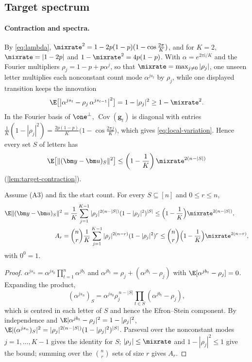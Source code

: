 \subsection{Target spectrum}
\label{app:target-spectrum}

\paragraph{Contraction and spectra.}\label{app:contraction} By \cref{eq:lambda}, $\mixrate^2=1-2p(1-p)(1-\cos\tfrac{2\pi}{K})$, and for $K=2$,
$\mixrate=|1-2p|$ and $1-\mixrate^2=4p(1-p)$. With $\alpha=e^{2\pi\mathrm i/K}$ and the Fourier multipliers
$\rho_j=1-p+p\alpha^j$, so that $\mixrate=\max_{j\ne0}|\rho_j|$, one unseen letter multiplies each nonconstant count
mode $\alpha^{js_t}$ by $\rho_j$, while one displayed transition keeps the innovation
\begin{equation}
 \E\bigl[\bigl|\alpha^{j s_t}-\rho_j\,\alpha^{j s_{t-1}}\bigr|^2\bigr]=1-|\rho_j|^2\ge1-\mixrate^2 .
 \label{eq:move-variance}
\end{equation}
In the Fourier basis of $\one^\perp$, $\operatorname{Cov}(\bm g_t)$ is diagonal with entries $\tfrac{1}{K}(1-|\rho_j|^2)=\tfrac{2p(1-p)}{K}\bigl(1-\cos\tfrac{2\pi j}{K}\bigr)$,
which gives \cref{eq:local-variation}. Hence every set $S$ of letters has
\begin{equation}
 \E\bigl[\|(\bm y-\bm u)_S\|^2\bigr]\le\left(1-\frac{1}{K}\right)\mixrate^{2(n-|S|)}
 \label{eq:horizon}
\end{equation}
(\cref{lem:target-contraction}).

\begin{lemma}
\label{lem:target-contraction}
Assume (A3) and fix the start count. For every $S\subseteq[n]$ and $0\le r\le n$,
\begin{align*}
 \E\|(\bm y-\bm u)_S\|^2&=\frac{1}{K}\sum_{j=1}^{K-1}|\rho_j|^{2(n-|S|)}(1-|\rho_j|^2)^{|S|}\le\Bigl(1-\frac{1}{K}\Bigr)\mixrate^{2(n-|S|)},\\
 A_r&=\binom nr\frac{1}{K}\sum_{j=1}^{K-1}|\rho_j|^{2(n-r)}(1-|\rho_j|^2)^r\le\binom nr\Bigl(1-\frac{1}{K}\Bigr)\mixrate^{2(n-r)},
\end{align*}
with $0^0=1$.
\end{lemma}

\begin{proof}
$\alpha^{js_n}=\alpha^{js_0}\prod_{t=1}^n\alpha^{jb_t}$ and $\alpha^{jb_t}=\rho_j+(\alpha^{jb_t}-\rho_j)$ with $\E[\alpha^{jb_t}-\rho_j]=0$. Expanding the product,
\begin{equation}
 (\alpha^{js_n})_S=\alpha^{js_0}\rho_j^{\,n-|S|}\prod_{t\in S}(\alpha^{jb_t}-\rho_j),
 \label{eq:product-rep}
\end{equation}
which is centred in each letter of $S$ and hence the Efron--Stein component. By independence and $\E|\alpha^{jb_t}-\rho_j|^2=1-|\rho_j|^2$,
$\E|(\alpha^{js_n})_S|^2=|\rho_j|^{2(n-|S|)}(1-|\rho_j|^2)^{|S|}$. Parseval over the nonconstant modes $j=1,\ldots,K-1$ gives the identity for $S$;
$|\rho_j|\le\mixrate$ and $1-|\rho_j|^2\le1$ give the bound; summing over the $\binom nr$ sets of size $r$ gives $A_r$.
\end{proof}


